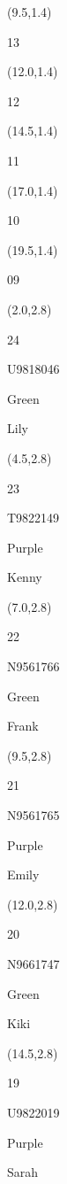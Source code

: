 \documentclass[a4paper]{article}
\newcommand{\myseat}[5]{%
\vspace{-0.1cm} \hspace{-0.5cm}
\parbox[t][2.2cm][t]{3.5cm}{%
\small #1 %
\begin{description}
\vspace{-0.1cm}
\item [ID:] #2
\vspace{-0.1cm}
\item [Team:] #3 \normalsize
\vspace{-0.1cm}
\item \normalsize #4 #5
\vspace{-0.1cm}
\end{description}
}
}
\begin{document}
\begin{CJK}{UTF8}{cyberbit}
\begin{textblock}{2.5}(9.5,1.4)
\textblockcolor{}
\myseat{13}{}{}{}{}
\end{textblock}

\begin{textblock}{2.5}(12.0,1.4)
\textblockcolor{}
\myseat{12}{}{}{}{}
\end{textblock}

\begin{textblock}{2.5}(14.5,1.4)
\textblockcolor{}
\myseat{11}{}{}{}{}
\end{textblock}

\begin{textblock}{2.5}(17.0,1.4)
\textblockcolor{}
\myseat{10}{}{}{}{}
\end{textblock}

\begin{textblock}{2.5}(19.5,1.4)
\textblockcolor{}
\myseat{09}{}{}{}{}
\end{textblock}


\begin{textblock}{2.5}(2.0,2.8)
\myseat{24}{U9818046}{Green}{Lily}{}
\end{textblock}

\begin{textblock}{2.5}(4.5,2.8)
\myseat{23}{T9822149}{Purple}{Kenny}{}
\end{textblock}

\begin{textblock}{2.5}(7.0,2.8)
\myseat{22}{N9561766}{Green}{Frank}{}
\end{textblock}

\begin{textblock}{2.5}(9.5,2.8)
\myseat{21}{N9561765}{Purple}{Emily}{}
\end{textblock}

\begin{textblock}{2.5}(12.0,2.8)
\myseat{20}{N9661747}{Green}{Kiki}{}
\end{textblock}

\begin{textblock}{2.5}(14.5,2.8)
\myseat{19}{U9822019}{Purple}{Sarah}{}
\end{textblock}


\end{CJK}
\end{document}
